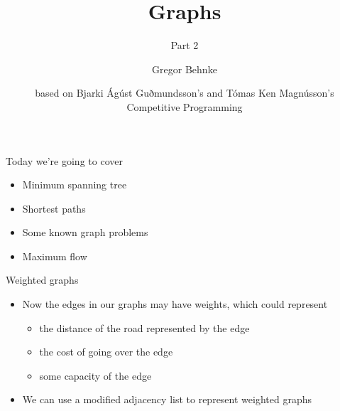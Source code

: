 \documentclass[12pt,t]{beamer}
\title{Graphs}
\subtitle{Part 2}
\author{Gregor Behnke}
\institute{Institute of Artificial Intelligence\\ Ulm University}
\date{\tiny based on Bjarki Ágúst Guðmundsson's and Tómas Ken Magnússon's\\Competitive Programming}
\newcommand{\bi}{\begin{itemize}}
\newcommand{\ei}{\end{itemize}}
\begin{document}
{
    \frame{
        \titlepage
    }
}


\begin{frame}{Today we're going to cover}
    \vspace{50pt}
    \bi
        \item Minimum spanning tree
        \item Shortest paths
        \item Some known graph problems
        \item Maximum flow
      
    \ei
\end{frame}


\begin{frame}{Weighted graphs}
    \vspace{30pt}
    \bi
        \item Now the edges in our graphs may have weights, which could represent
            \bi
                \item the distance of the road represented by the edge
                \item the cost of going over the edge
                \item some capacity of the edge
            \ei

        \item We can use a modified adjacency list to represent weighted graphs
    \ei
\end{frame}
\end{document}
